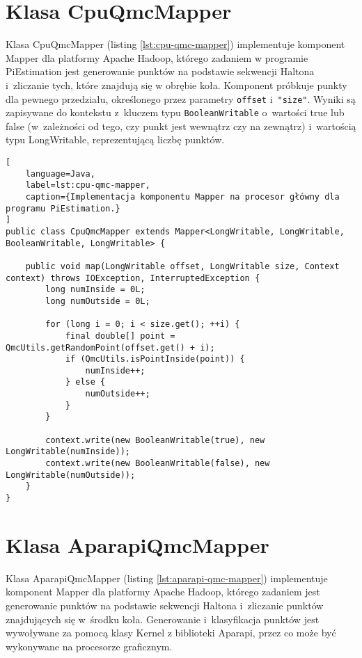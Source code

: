 \section*{Klasa CpuQmcMapper} \label{ch:cpu-qmc-mapper}

Klasa CpuQmcMapper (listing \ref{lst:cpu-qmc-mapper}) implementuje komponent Mapper dla
platformy Apache Hadoop, którego zadaniem w programie PiEstimation jest generowanie punktów na
podstawie sekwencji Haltona i~zliczanie tych, które znajdują się w obrębie koła. Komponent
próbkuje punkty dla pewnego przedziału, określonego przez parametry \lstinline{offset} 
i~\lstinline{"size"}. Wyniki są zapisywane do kontekstu z~kluczem typu \lstinline{BooleanWritable}
o~wartości true lub false (w~zależności od tego, czy punkt jest wewnątrz czy na zewnątrz)
i~wartością typu LongWritable, reprezentującą liczbę punktów.

\begin{lstlisting}[
    language=Java,
    label=lst:cpu-qmc-mapper,
    caption={Implementacja komponentu Mapper na procesor główny dla programu PiEstimation.}
]
public class CpuQmcMapper extends Mapper<LongWritable, LongWritable, BooleanWritable, LongWritable> {

    public void map(LongWritable offset, LongWritable size, Context context) throws IOException, InterruptedException {
        long numInside = 0L;
        long numOutside = 0L;

        for (long i = 0; i < size.get(); ++i) {
            final double[] point = QmcUtils.getRandomPoint(offset.get() + i);
            if (QmcUtils.isPointInside(point)) {
                numInside++;
            } else {
                numOutside++;
            }
        }

        context.write(new BooleanWritable(true), new LongWritable(numInside));
        context.write(new BooleanWritable(false), new LongWritable(numOutside));
    }
}
\end{lstlisting}
\newpage

\section*{Klasa AparapiQmcMapper} \label{ch:aparapi-qmc-mapper}

Klasa AparapiQmcMapper (listing \ref{lst:aparapi-qmc-mapper}) implementuje komponent Mapper dla
platformy Apache Hadoop, którego zadaniem jest generowanie punktów na podstawie sekwencji
Haltona i~zliczanie punktów znajdujących się w~środku koła. Generowanie i~klasyfikacja punktów
jest wywoływane za pomocą klasy Kernel z biblioteki Aparapi, przez co może być wykonywane na
procesorze graficznym. 

